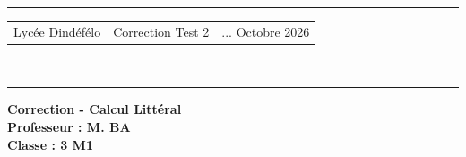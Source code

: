 \documentclass[a4paper,12pt]{article}
\begin{document}
\hrule %
\begin{center}
    \begin{tabular}{@{} p{5cm} p{5cm} p{5cm} @{}} %
        Lycée Dindéfélo & \quad\quad\quad Correction Test 2 & ... Octobre 2026 \\
    \end{tabular}
    \\[-0.01cm] %
    \hrule %
\end{center}
\begin{center}
    \textbf{\Large Correction - Calcul Littéral } \\[0.2cm]
    \textbf{\large Professeur : M. BA} \\[0.2cm]
    \textbf{Classe : 3 M1} \\[0.2cm]
\end{center}
\end{document}

